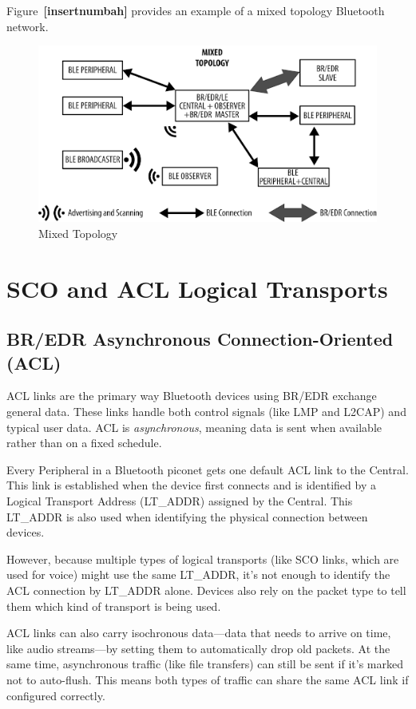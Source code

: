 Figure~\textbf{[insertnumbah]} provides an example of a mixed topology Bluetooth network.

\begin{figure}[h]
    \caption{Mixed Topology}
    \includegraphics{mixedtopology.png}
    \end{figure}

\section{SCO and ACL Logical Transports}

\subsection{BR/EDR Asynchronous Connection-Oriented (ACL)}

ACL links are the primary way Bluetooth devices using BR/EDR exchange general data. These links handle both control signals (like LMP and L2CAP) and typical user data. ACL is \textit{asynchronous}, meaning data is sent when available rather than on a fixed schedule.

Every Peripheral in a Bluetooth piconet gets one default ACL link to the Central. This link is established when the device first connects and is identified by a Logical Transport Address (LT\_ADDR) assigned by the Central. This LT\_ADDR is also used when identifying the physical connection between devices.

However, because multiple types of logical transports (like SCO links, which are used for voice) might use the same LT\_ADDR, it’s not enough to identify the ACL connection by LT\_ADDR alone. Devices also rely on the packet type to tell them which kind of transport is being used.

ACL links can also carry isochronous data—data that needs to arrive on time, like audio streams—by setting them to automatically drop old packets. At the same time, asynchronous traffic (like file transfers) can still be sent if it’s marked not to auto-flush. This means both types of traffic can share the same ACL link if configured correctly.

